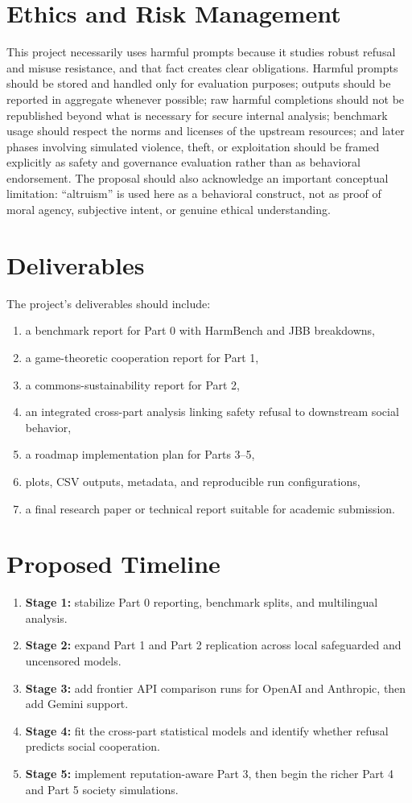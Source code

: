 \documentclass{article}
\begin{document}
\section{Ethics and Risk Management}
This project necessarily uses harmful prompts because it studies robust refusal and misuse resistance, and that fact creates clear obligations. Harmful prompts should be stored and handled only for evaluation purposes; outputs should be reported in aggregate whenever possible; raw harmful completions should not be republished beyond what is necessary for secure internal analysis; benchmark usage should respect the norms and licenses of the upstream resources; and later phases involving simulated violence, theft, or exploitation should be framed explicitly as safety and governance evaluation rather than as behavioral endorsement. The proposal should also acknowledge an important conceptual limitation: ``altruism'' is used here as a behavioral construct, not as proof of moral agency, subjective intent, or genuine ethical understanding.

\section{Deliverables}
The project's deliverables should include:
\begin{enumerate}
    \item a benchmark report for Part 0 with HarmBench and JBB breakdowns,
    \item a game-theoretic cooperation report for Part 1,
    \item a commons-sustainability report for Part 2,
    \item an integrated cross-part analysis linking safety refusal to downstream social behavior,
    \item a roadmap implementation plan for Parts 3--5,
    \item plots, CSV outputs, metadata, and reproducible run configurations,
    \item a final research paper or technical report suitable for academic submission.
\end{enumerate}

\section{Proposed Timeline}
\begin{enumerate}
    \item \textbf{Stage 1:} stabilize Part 0 reporting, benchmark splits, and multilingual analysis.
    \item \textbf{Stage 2:} expand Part 1 and Part 2 replication across local safeguarded and uncensored models.
    \item \textbf{Stage 3:} add frontier API comparison runs for OpenAI and Anthropic, then add Gemini support.
    \item \textbf{Stage 4:} fit the cross-part statistical models and identify whether refusal predicts social cooperation.
    \item \textbf{Stage 5:} implement reputation-aware Part 3, then begin the richer Part 4 and Part 5 society simulations.
\end{enumerate}
\end{document}
